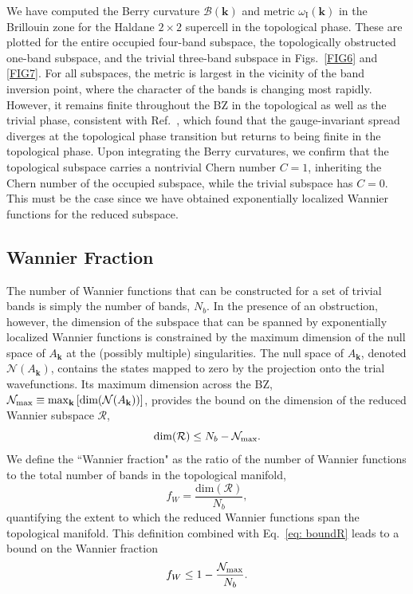 \documentclass[galley,aps,pra,10pt,amsmath,amssymb,
    superscriptaddress,nofootinbib,longbibliography]{revtex4-2}
\begin{document}
We have computed the Berry curvature $\mathcal{B}(\textbf{k})$ and metric $\omega_\textrm{I}(\textbf{k})$ in the Brillouin zone for the Haldane $2\times2$ supercell in the topological phase. These are plotted for the entire occupied four-band subspace, the topologically obstructed one-band subspace, and the trivial three-band subspace in Figs.~\ref{FIG6} and \ref{FIG7}. For all subspaces, the metric is largest in the vicinity of the band inversion point, where the character of the bands is changing most rapidly. However, it remains finite throughout the BZ in the topological as well as the trivial phase, consistent with Ref.~\cite{thronhauser2006}, which found that the gauge-invariant spread diverges at the topological phase transition but returns to being finite in the topological phase. Upon integrating the Berry curvatures, we confirm that the topological subspace carries a nontrivial Chern number $C=1$, inheriting the Chern number of the occupied subspace, while the trivial subspace has $C=0$. This must be the case since we have obtained exponentially localized Wannier functions for the reduced subspace. 


\subsection{Wannier Fraction}
\label{ss:WF}

The number of Wannier functions that can be constructed for a set of trivial bands is simply the number of bands, $N_b$. In the presence of an obstruction, however, the dimension of the subspace that can be spanned by exponentially localized Wannier functions is constrained by the maximum dimension of the null space of $A_{\mathbf{k}}$ at the (possibly multiple) singularities. The null space of $A_{\mathbf{k}}$, denoted $\mathcal{N}(A_{\mathbf{k}})$, contains the states mapped to zero by the projection onto the trial wavefunctions. Its maximum dimension across the BZ, $\mathcal{N}_{\rm max} \equiv \max_{\mathbf{k}}\left[ \text{dim}(\mathcal{N}(A_\mathbf{k})) \right]$, provides the bound on the dimension of the reduced Wannier subspace $\mathcal{R}$,
\begin{equation}
\label{eq: boundR}
    \dim({\mathcal{R}}) \leq N_b - \mathcal{N}_{\rm max}.
\end{equation}
We define the ``Wannier fraction" as the ratio of the number of Wannier functions to the total number of bands in the topological manifold,
\begin{equation}
    f_{W} = \frac{\text{dim}(\mathcal{R})}{N_b},
\end{equation}
quantifying the extent to which the reduced Wannier functions span the topological manifold. This definition combined with Eq.~\ref{eq: boundR} leads to a bound on the Wannier fraction
\begin{equation}
    f_W \leq 1 - \frac{ \mathcal{N}_{\rm max}}{N_b}.
\end{equation}
\end{document}
